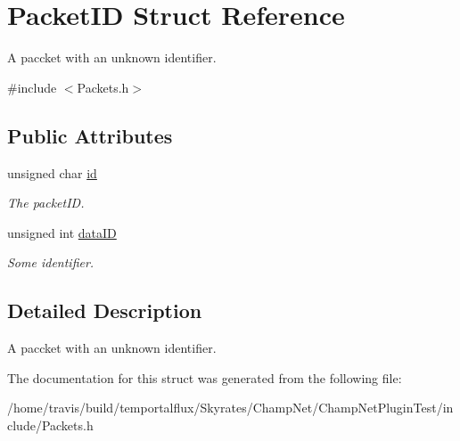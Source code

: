 \hypertarget{struct_packet_i_d}{\section{Packet\-I\-D Struct Reference}
\label{struct_packet_i_d}
}


A paccket with an unknown identifier.  




{\ttfamily \#include $<$Packets.\-h$>$}

\subsection*{Public Attributes}
\begin{DoxyCompactItemize}
\item 
\hypertarget{struct_packet_i_d_aee315db3996e3fd0f36a1a3909b92f92}{unsigned char \hyperlink{struct_packet_i_d_aee315db3996e3fd0f36a1a3909b92f92}{id}}\label{struct_packet_i_d_aee315db3996e3fd0f36a1a3909b92f92}

\begin{DoxyCompactList}\small\item\em The packet\-I\-D. \end{DoxyCompactList}\item 
\hypertarget{struct_packet_i_d_ade442ec81edb1c528ea29af0941f7890}{unsigned int \hyperlink{struct_packet_i_d_ade442ec81edb1c528ea29af0941f7890}{data\-I\-D}}\label{struct_packet_i_d_ade442ec81edb1c528ea29af0941f7890}

\begin{DoxyCompactList}\small\item\em Some identifier. \end{DoxyCompactList}\end{DoxyCompactItemize}


\subsection{Detailed Description}
A paccket with an unknown identifier. 

The documentation for this struct was generated from the following file\-:\begin{DoxyCompactItemize}
\item 
/home/travis/build/temportalflux/\-Skyrates/\-Champ\-Net/\-Champ\-Net\-Plugin\-Test/include/Packets.\-h\end{DoxyCompactItemize}
